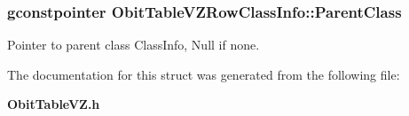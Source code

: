 \subsubsection{\setlength{\rightskip}{0pt plus 5cm}gconstpointer {\bf Obit\-Table\-VZRow\-Class\-Info::Parent\-Class}}\label{structObitTableVZRowClassInfo_o3}


Pointer to parent class Class\-Info, Null if none. 



The documentation for this struct was generated from the following file:\begin{CompactItemize}
\item 
{\bf Obit\-Table\-VZ.h}\end{CompactItemize}
